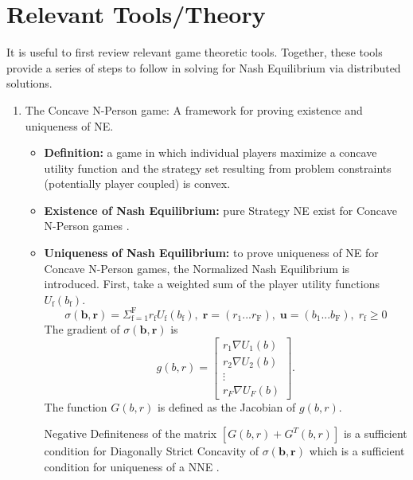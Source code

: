 \documentclass[12pt,a4paper]{report}
\begin{document}
\section{Relevant Tools/Theory}\label{tools}
It is useful to first review relevant game theoretic tools. Together, these tools provide a series of steps to follow in solving for Nash Equilibrium via distributed solutions. 

\begin{enumerate}
\item The Concave N-Person game: A framework for proving existence and uniqueness of NE.

\begin{itemize}
\item
\textbf{Definition:} a game in which individual players maximize a concave utility function and the strategy set resulting from problem constraints (potentially player coupled) is convex. 
\item 
\textbf{Existence of Nash Equilibrium:} pure Strategy NE exist for Concave N-Person  games \cite[Thm1]{rosen1964existence}. 
\item
\textbf{Uniqueness of Nash Equilibrium:} to prove uniqueness of NE for Concave N-Person  games, the Normalized Nash Equilibrium is introduced.
First, take a weighted sum of the player utility functions $U_{\mathrm{f}}(b_{\text{f}})$.
\begin{equation*}
\sigma(\mathbf{b},\mathbf{r})  = \Sigma_{\mathrm{f=1}}^{\mathrm{F}} r_{\mathrm{f}}U_{\mathrm{f}}(b_{\text{f}}),\; \mathbf{r}=(r_{\text{1}}... r_{\text{F}})
,\; \mathbf{u}=(b_{\text{1}}... b_{\text{F}})
, \; 
r_{\mathrm{f}} \geq 0
\end{equation*}
The gradient of $
\sigma(\mathbf{b},\mathbf{r})$
is  
\begin{equation}
g(b,r)= 
\begin{bmatrix}
r_1 \nabla U_{1}(b)
\\
r_2 \nabla U_{2}(b)
\\
\vdots\\
r_F \nabla U_{F}(b)
\end{bmatrix}.
\end{equation}
 The function $G(b,r) $ is defined as the Jacobian of $g(b,r) $.



Negative Definiteness of the matrix $[G(b,r)+G^{T}(b,r)] $ is a sufficient condition for Diagonally Strict Concavity of $\sigma(\mathbf{b},\mathbf{r})$ which is a sufficient condition for uniqueness of a NNE \cite[Thm4]{rosen1964existence}.



\end{itemize}
\end{enumerate}
\end{document}
